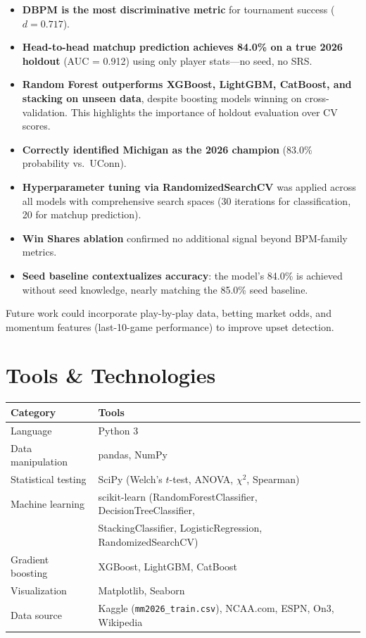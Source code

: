 \documentclass[12pt, a4paper]{article}
\begin{document}
\begin{itemize}
    \item \textbf{DBPM is the most discriminative metric} for tournament success ($d = 0.717$).
    \item \textbf{Head-to-head matchup prediction achieves 84.0\% on a true 2026 holdout} (AUC = 0.912) using only player stats---no seed, no SRS.
    \item \textbf{Random Forest outperforms XGBoost, LightGBM, CatBoost, and stacking on unseen data}, despite boosting models winning on cross-validation. This highlights the importance of holdout evaluation over CV scores.
    \item \textbf{Correctly identified Michigan as the 2026 champion} (83.0\% probability vs.\ UConn).
    \item \textbf{Hyperparameter tuning via RandomizedSearchCV} was applied across all models with comprehensive search spaces (30 iterations for classification, 20 for matchup prediction).
    \item \textbf{Win Shares ablation} confirmed no additional signal beyond BPM-family metrics.
    \item \textbf{Seed baseline contextualizes accuracy}: the model's 84.0\% is achieved without seed knowledge, nearly matching the 85.0\% seed baseline.
\end{itemize}

Future work could incorporate play-by-play data, betting market odds, and momentum features (last-10-game performance) to improve upset detection.

\section*{Tools \& Technologies}

\begin{table}[H]
\centering
\begin{tabular}{@{}ll@{}}
\toprule
\textbf{Category} & \textbf{Tools} \\
\midrule
Language & Python 3 \\
Data manipulation & pandas, NumPy \\
Statistical testing & SciPy (Welch's $t$-test, ANOVA, $\chi^2$, Spearman) \\
Machine learning & scikit-learn (RandomForestClassifier, DecisionTreeClassifier, \\
 & \quad StackingClassifier, LogisticRegression, RandomizedSearchCV) \\
Gradient boosting & XGBoost, LightGBM, CatBoost \\
Visualization & Matplotlib, Seaborn \\
Data source & Kaggle (\texttt{mm2026\_train.csv}), NCAA.com, ESPN, On3, Wikipedia \\
\bottomrule
\end{tabular}
\end{table}
\end{document}
